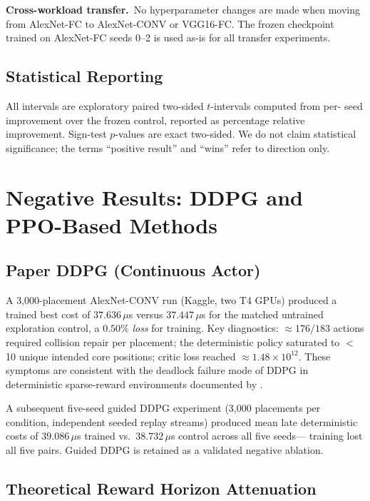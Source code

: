 \documentclass[10pt,conference]{IEEEtran}
\begin{document}
\textbf{Cross-workload transfer.}\
No hyperparameter changes are made when moving from AlexNet-FC to AlexNet-CONV
or VGG16-FC.  The frozen checkpoint trained on AlexNet-FC seeds 0--2 is used
as-is for all transfer experiments.

\subsection{Statistical Reporting}

All intervals are exploratory paired two-sided $t$-intervals computed from per-
seed improvement over the frozen control, reported as percentage relative
improvement.  Sign-test $p$-values are exact two-sided.  We do not claim
statistical significance; the terms ``positive result'' and ``wins'' refer to
direction only.

\section{Negative Results: DDPG and PPO-Based Methods}
\label{sec:ablations}

\subsection{Paper DDPG (Continuous Actor)}

A 3,000-placement AlexNet-CONV run (Kaggle, two T4 GPUs) produced a trained
best cost of $37.636\,\mu$s versus $37.447\,\mu$s for the matched untrained
exploration control, a $0.50\%$ \emph{loss} for training.  Key diagnostics:
${\approx}176/183$ actions required collision repair per placement;
the deterministic policy saturated to $<$10 unique intended core positions;
critic loss reached $\approx 1.48 \times 10^{12}$.  These symptoms are
consistent with the deadlock failure mode of DDPG in deterministic sparse-reward
environments documented by \citet{matheron2019ddpg}.

A subsequent five-seed guided DDPG experiment (3,000 placements per condition,
independent seeded replay streams) produced mean late deterministic costs of
$39.086\,\mu$s trained vs.\ $38.732\,\mu$s control across all five seeds---
training lost all five pairs.  Guided DDPG is retained as a validated negative
ablation.


\subsection{Theoretical Reward Horizon Attenuation}
\label{sec:horizon-math}
\end{document}
